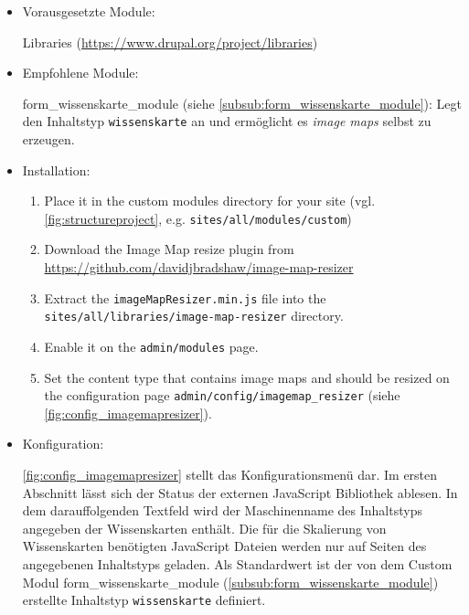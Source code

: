\begin{itemize}[parsep=0pt, itemsep=5.0pt plus 2.0pt minus 1.0pt, leftmargin=*]
	\item Vorausgesetzte Module:
	
	Libraries (\url{https://www.drupal.org/project/libraries})
	
	
	\item Empfohlene Module: 
	
	form\_wissenskarte\_module (siehe \cref{subsub:form_wissenskarte_module}): Legt den Inhaltstyp \lstinline|wissenskarte| an und ermöglicht es \textit{image maps} selbst zu erzeugen.	
	
	\item Installation:
	\begin{enumerate}
		\item Place it in the custom modules directory for your site (vgl. \cref{fig:structureproject}, e.g. \lstinline|sites/all/modules/custom|)
		\item Download the Image Map resize plugin from \url{https://github.com/davidjbradshaw/image-map-resizer}
		\item Extract the \lstinline|imageMapResizer.min.js| file into the \lstinline|sites/all/libraries/image-map-resizer| directory.
		\item Enable it on the \lstinline|admin/modules| page.
		\item Set the content type that contains image maps and should be resized on the configuration page \lstinline|admin/config/imagemap_resizer| (siehe \cref{fig:config_imagemapresizer}).
	\end{enumerate}
	
	
	\item Konfiguration:
	
	\cref{fig:config_imagemapresizer} stellt das Konfigurationsmenü dar. Im ersten Abschnitt lässt sich der Status der externen JavaScript Bibliothek ablesen. In dem darauffolgenden Textfeld wird der Maschinenname des Inhaltstyps angegeben der Wissenskarten enthält. Die für die Skalierung von Wissenskarten benötigten JavaScript Dateien werden nur auf Seiten des angegebenen Inhaltstyps geladen. Als Standardwert ist der von dem Custom Modul form\_wissenskarte\_module (\cref{subsub:form_wissenskarte_module}) erstellte Inhaltstyp \lstinline|wissenskarte| definiert.
	
\end{itemize}



\newpage
